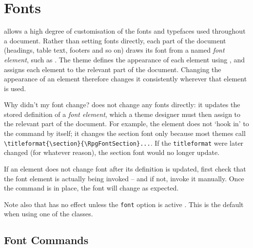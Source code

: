 \chapter{Fonts} \label{C:Fonts}


	\rpgtex{} allows a high degree of customisation of the fonts and typefaces used throughout a document. Rather than setting fonts directly, each part of the document (headings, table text, footers and so on) draws its font from a named \emph{font element}, such as . The theme defines the appearance of each element using , and assigns each element to the relevant part of the document. Changing the appearance of an element therefore changes it consistently wherever that element is used.

	\begin{RpgSidebar}{Why didn't my font change?}
		 does not change any fonts directly: it updates the stored definition of a \emph{font element}, which a theme designer must then assign to the relevant part of the document. For example, the  element does not `hook in' to the  command by itself; it changes the section font only because most themes call \texttt{\textbackslash{}titleformat\{\textbackslash{}section\}\{\textbackslash{}RpgFontSection\}...}. If the \texttt{titleformat} were later changed (for whatever reason), the section font would no longer update.

		If an element does not change font after its definition is updated, first check that the font element is actually being invoked -- and if not, invoke it manually. Once the command is in place, the font will change as expected.

		Note also that  has no effect unless the \texttt{font} option is active . This is the default when using one of the \rpgtex{} classes.
	\end{RpgSidebar}


	\section{Font Commands}


